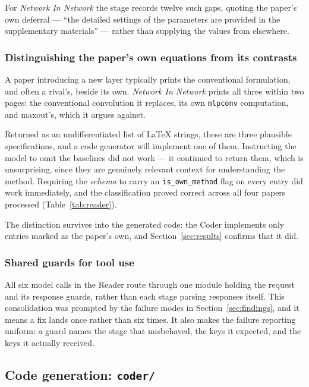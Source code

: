 \documentclass[10pt,twocolumn]{article}
\begin{document}
For \emph{Network In Network} the stage records twelve such gaps, quoting the paper's own
deferral --- ``the detailed settings of the parameters are provided in the supplementary
materials'' --- rather than supplying the values from elsewhere.

\subsubsection{Distinguishing the paper's own equations from its contrasts}

A paper introducing a new layer typically prints the conventional formulation, and often a
rival's, beside its own. \emph{Network In Network} prints all three within two pages: the
conventional convolution it replaces, its own \texttt{mlpconv} computation, and maxout's,
which it argues against.

Returned as an undifferentiated list of LaTeX strings, these are three plausible
specifications, and a code generator will implement one of them. Instructing the model to
omit the baselines did not work --- it continued to return them, which is unsurprising,
since they are genuinely relevant context for understanding the method. Requiring the
\emph{schema} to carry an \texttt{is\_own\_method} flag on every entry did work
immediately, and the classification proved correct across all four papers processed
(Table~\ref{tab:reader}).

The distinction survives into the generated code: the Coder implements only entries marked
as the paper's own, and Section~\ref{sec:results} confirms that it did.

\subsubsection{Shared guards for tool use}

All six model calls in the Reader route through one module holding the request and its
response guards, rather than each stage parsing responses itself. This consolidation was
prompted by the failure modes in Section~\ref{sec:findings}, and it means a fix lands once
rather than six times. It also makes the failure reporting uniform: a guard names the
stage that misbehaved, the keys it expected, and the keys it actually received.

\subsection{Code generation: \texttt{coder/}}
\end{document}

